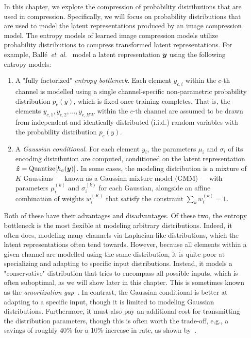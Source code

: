 In this chapter, we explore the compression of probability distributions that are used in compression.
Specifically, we will focus on probability distributions that are used to model the latent representations produced by an image compression model.
The entropy models of learned image compression models utilize probability distributions to compress transformed latent representations.
For example, Ballé~\emph{et~al.}~\cite{balle2018variational} model a latent representation ${\boldsymbol{y}}$ using the following entropy models:
\begin{enumerate}
  \item
    A "fully factorized" \emph{entropy bottleneck}.
    Each element ${y}_{c,i}$ within the $c$-th channel is modelled using a single channel-specific non-parametric probability distribution ${p}_{c}(y)$, which is fixed once training completes.
    That is, the elements ${y}_{c,1}, {y}_{c,2}, \ldots, {y}_{c,H W}$ within the $c$-th channel are assumed to be drawn from independent and identically distributed (i.i.d.) random variables with the probability distribution ${p}_c(y)$.
  \item
    A \emph{Gaussian conditional}.
    For each element ${y}_{i}$, the parameters ${\mu}_{i}$ and ${\sigma}_{i}$ of its encoding distribution are computed, conditioned on the latent representation ${\boldsymbol{\hat{z}}} = \operatorname{Quantize}[h_a({\boldsymbol{y}})]$.
    In some cases, the modeling distribution is a mixture of $K$ Gaussians --- known as a Gaussian mixture model (GMM) --- with parameters ${\mu}_{i}^{(k)}$ and ${\sigma}_{i}^{(k)}$ for each Gaussian, alongside an affine combination of weights ${w}_{i}^{(K)}$ that satisfy the constraint $\sum_k {w}_{i}^{(k)} = 1$.
\end{enumerate}
Both of these have their advantages and disadvantages.
Of these two, the entropy bottleneck is the most flexible at modeling arbitrary distributions.
Indeed, it often does, modeling many channels via Laplacian-like distributions, which the latent representations often tend towards.
However, because all elements within a given channel are modelled using the same distribution, it is quite poor at specializing and adapting to specific input distributions.
Instead, it models a "conservative" distribution that tries to encompass all possible inputs, which is often suboptimal, as we will show later in this chapter.
This is sometimes known as the \emph{amortization gap}~\cite{balcilar2022amortizationgap,cremer2018inferencesuboptimality}.
In contrast, the Gaussian conditional is better at adapting to a specific input, though it is limited to modeling Gaussian distributions.
Furthermore, it must also pay an additional cost for transmitting the distribution parameters, though this is often worth the trade-off, e.g., a savings of roughly 40\% for a 10\% increase in rate, as shown by~\cite{balle2018variational}.


